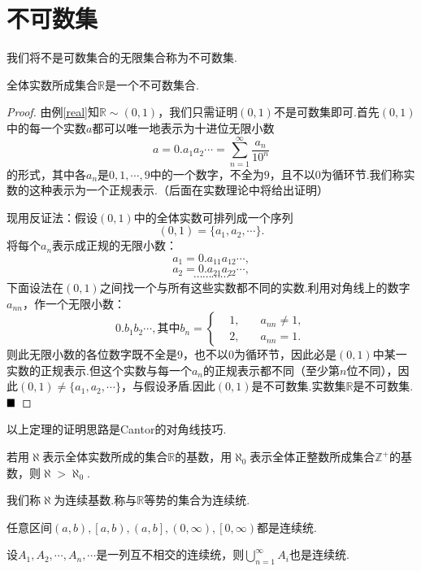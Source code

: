 \section{不可数集}
我们将不是可数集合的{\heiti 无限集合}称为{\heiti 不可数集}.
\begin{theorem}
	全体实数所成集合$\mathbb{R}$是一个不可数集合.
\end{theorem}
\begin{proof}
	由例\ref{real}知$\mathbb{R}\sim(0,1)$，我们只需证明$(0,1)$不是可数集即可.首先$(0,1)$中的每一个实数$a$都可以唯一地表示为十进位无限小数
	$$a=0.a_1a_2\cdots=\sum\limits_{n=1}^{\infty}\dfrac{a_n}{10^n}$$
	的形式，其中各$a_n$是$0,1,\cdots,9$中的一个数字，不全为$9$，且不以$0$为循环节.我们称实数的这种表示为一个正规表示.（后面在实数理论中将给出证明）
	
	现用反证法：假设$(0,1)$中的全体实数可排列成一个序列
	$$(0,1)=\{a_1,a_2,\cdots\}.$$
	将每个$a_n$表示成正规的无限小数：
	$$a_1=0.a_{11}a_{12}\cdots,$$
	$$a_2=0.a_{21}a_{22}\cdots,$$
	$$\cdots\cdots\cdots\cdots$$
	下面设法在$(0,1)$之间找一个与所有这些实数都不同的实数.利用对角线上的数字$a_{nn}$，作一个无限小数：
	$$0.b_1b_2\cdots,\text{其中}b_n=\left\{
	\begin{aligned}
		&1,\quad & a_{nn}\neq 1,\\
		&2,\quad & a_{nn}=1.
	\end{aligned}
	\right.
	$$
	则此无限小数的各位数字既不全是$9$，也不以$0$为循环节，因此必是$(0,1)$中某一实数的正规表示.但这个实数与每一个$a_n$的正规表示都不同（至少第$n$位不同），因此$(0,1)\neq\{a_1,a_2,\cdots\}$，与假设矛盾.因此$(0,1)$是不可数集.实数集$\mathbb{R}$是不可数集.$\hfill\blacksquare$
\end{proof}
\begin{remark}
	以上定理的证明思路是Cantor的对角线技巧.
\end{remark}
\begin{corollary}
	若用$\aleph$表示全体实数所成的集合$\mathbb{R}$的基数，用$\aleph_0$表示全体正整数所成集合$\mathbb{Z}^+$的基数，则$\aleph>\aleph_0$.
\end{corollary}
我们称$\aleph$为{\heiti 连续基数}.称与$\mathbb{R}$等势的集合为{\heiti 连续统}.
\begin{theorem}
	任意区间$(a,b),\left[a,b\right),\left(a,b\right],(0,\infty),\left[0,\infty\right)$都是连续统.
\end{theorem}
\begin{theorem}
	设$A_1,A_2,\cdots,A_n,\cdots$是一列互不相交的连续统，则$\bigcup\limits_{n=1}^{\infty}A_i$也是连续统.
\end{theorem}
